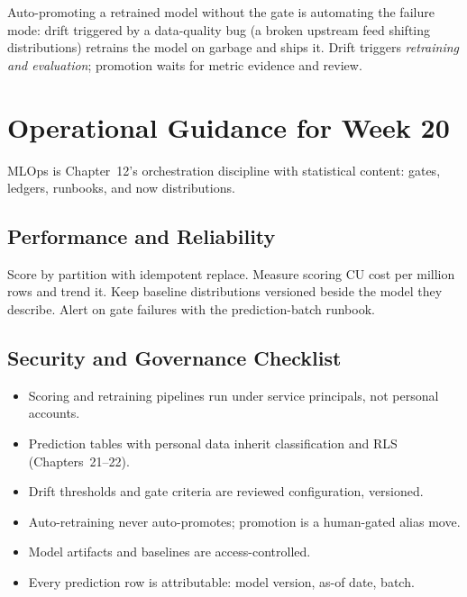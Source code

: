 \begin{pitfall}
Auto-promoting a retrained model without the gate is automating the failure mode: drift triggered by a data-quality bug (a broken upstream feed shifting distributions) retrains the model on garbage and ships it. Drift triggers \emph{retraining and evaluation}; promotion waits for metric evidence and review.
\end{pitfall}

\section{Operational Guidance for Week 20}
MLOps is Chapter~12's orchestration discipline with statistical content: gates, ledgers, runbooks, and now distributions.

\subsection{Performance and Reliability}
Score by partition with idempotent replace. Measure scoring CU cost per million rows and trend it. Keep baseline distributions versioned beside the model they describe. Alert on gate failures with the prediction-batch runbook.

\subsection{Security and Governance Checklist}
\begin{itemize}
    \item Scoring and retraining pipelines run under service principals, not personal accounts.
    \item Prediction tables with personal data inherit classification and RLS (Chapters~21--22).
    \item Drift thresholds and gate criteria are reviewed configuration, versioned.
    \item Auto-retraining never auto-promotes; promotion is a human-gated alias move.
    \item Model artifacts and baselines are access-controlled.
    \item Every prediction row is attributable: model version, as-of date, batch.
\end{itemize}

